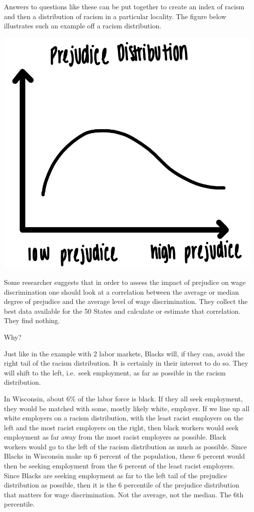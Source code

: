 \documentclass[
]{book}
\begin{document}
Answers to questions like these can be put together to create an index of racism and then a distribution of racism in a particular locality. The figure below illustrates such an example off a racism distribution.

\begin{center}\includegraphics[width=0.6\linewidth]{img/intro/prejdist} \end{center}

Some researcher suggests that in order to assess the impact of prejudice on wage discrimination one should look at a correlation between the average or median degree of prejudice and the average level of wage discrimination. They collect the best data available for the 50 States and calculate or estimate that correlation. They find nothing.

Why?

Just like in the example with 2 labor markets, Blacks will, if they can, avoid the right tail of the racism distribution. It is certainly in their interest to do so. They will shift to the left, i.e.~seek employment, as far as possible in the racism distribution.

In Wisconsin, about 6\% of the labor force is black. If they all seek employment, they would be matched with some, mostly likely white, employer. If we line up all white employers on a racism distribution, with the least racist employers on the left and the most racist employers on the right, then black workers would seek employment as far away from the most racist employers as possible. Black workers would go to the left of the racism distribution as much as possible. Since Blacks in Wisconsin make up 6 percent of the population, these 6 percent would then be seeking employment from the 6 percent of the least racist employers. Since Blacks are seeking employment as far to the left tail of the prejudice distribution as possible, then it is the 6 percentile of the prejudice distribution that matters for wage discrimination. Not the average, not the median. The 6th percentile.
\end{document}
